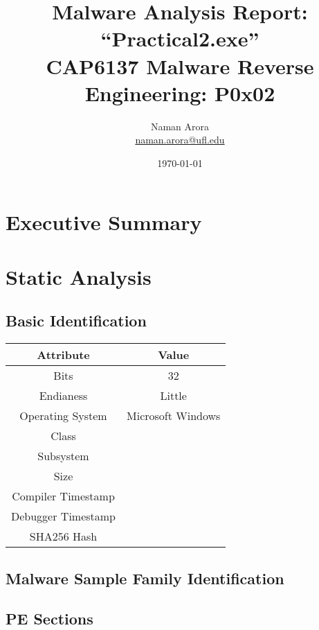 \documentclass[10pt,a4paper]{article}
\begin{document}

\title{Malware Analysis Report: ``Practical2.exe''\\ \vspace{-8pt} {\large CAP6137 Malware Reverse Engineering: P0x02}}
\author{{Naman Arora \\ \vspace{-10pt}\small \href{mailto:naman.arora@ufl.edu}{naman.arora@ufl.edu}}}
\date{\today}

\maketitle
\newpage
\tableofcontents
\newpage
\section{Executive Summary}

\section{Static Analysis}
\subsection{Basic Identification}
\begin{center}
	\begin{tabular}{c | c}
		Attribute & Value\\
		\hline
		\hline
		Bits & 32\\
		Endianess & Little\\
		Operating System & Microsoft Windows\\
		\hline
		Class & \\
		Subsystem & \\
		\hline
		Size & \\
		Compiler Timestamp & \\
		Debugger Timestamp & \\
		SHA256 Hash & \\
		\hline
	\end{tabular}
\end{center}

\subsection{Malware Sample Family Identification}

\subsection{PE Sections}
\end{document}

